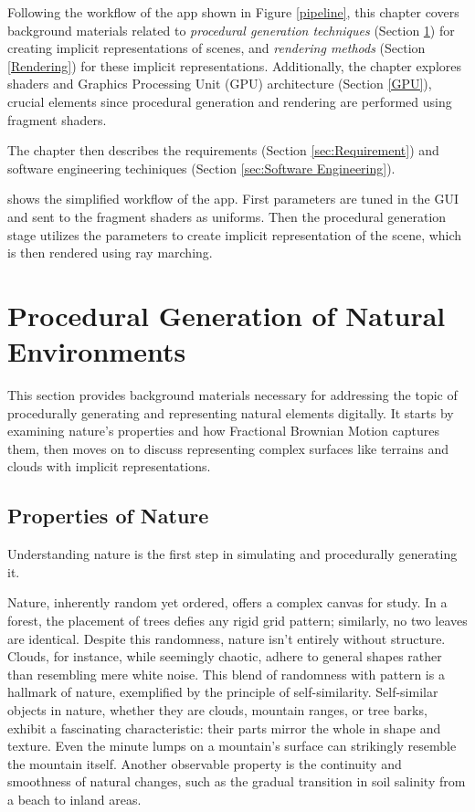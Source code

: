 \label{sec:Preparation}

Following the workflow of the app shown in Figure \ref{pipeline}, this chapter covers background materials related to \textit{procedural generation techniques} (Section \ref{Procedural Generation}) for creating implicit representations of scenes, and \textit{rendering methods} (Section \ref{Rendering}) for these implicit representations. Additionally, the chapter explores shaders and Graphics Processing Unit (GPU) architecture (Section \ref{GPU}), crucial elements since procedural generation and rendering are performed using fragment shaders.

The chapter then describes the requirements (Section \ref{sec:Requirement}) and software engineering techiniques (Section \ref{sec:Software Engineering}).


{shows the simplified workflow of the app. First parameters are tuned in the GUI and sent to the fragment shaders as uniforms. Then the procedural generation stage utilizes the parameters to create implicit representation of the scene, which is then rendered using ray marching.}


\section{Procedural Generation of Natural Environments}
\label{Procedural Generation}

This section provides background materials necessary for addressing the topic of procedurally generating and representing natural elements digitally. It starts by examining nature's properties and how Fractional Brownian Motion captures them, then moves on to discuss representing complex surfaces like terrains and clouds with implicit representations.

\subsection{Properties of Nature}

Understanding nature is the first step in simulating and procedurally generating it.

Nature, inherently random yet ordered, offers a complex canvas for study. In a forest, the placement of trees defies any rigid grid pattern; similarly, no two leaves are identical. Despite this randomness, nature isn't entirely without structure. Clouds, for instance, while seemingly chaotic, adhere to general shapes rather than resembling mere white noise. This blend of randomness with pattern is a hallmark of nature, exemplified by the principle of self-similarity. Self-similar objects in nature, whether they are clouds, mountain ranges, or tree barks, exhibit a fascinating characteristic: their parts mirror the whole in shape and texture. Even the minute lumps on a mountain's surface can strikingly resemble the mountain itself. Another observable property is the continuity and smoothness of natural changes, such as the gradual transition in soil salinity from a beach to inland areas.

